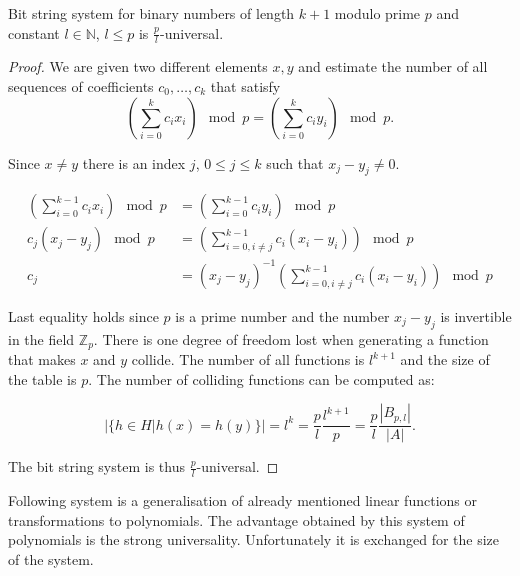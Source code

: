 \begin{remark}
Bit string system for binary numbers of length $k + 1$ modulo prime $p$ and constant $l \in \mathbb{N}$, $l \leq p$ is $\frac{p}{l}$-universal.
\end{remark}
\begin{proof}
We are given two different elements $x, y$ and estimate the number of all sequences of coefficients $c_0, \dots, c_k$ that satisfy
\[
\left( \displaystyle \sum_{i = 0}^{k} c_i x_i \right) \mod p = \left( \displaystyle \sum_{i = 0}^{k} c_i y_i \right) \mod p \textit{.}
\]

Since $x \neq y$ there is an index $j$, $0 \leq j \leq k$ such that $x_j - y_j \neq 0$.

\begin{displaymath}
\begin{split}
\left(\displaystyle \sum_{i=0}^{k-1} c_i x_i\right) \mod p & = \left(\displaystyle \sum_{i=0}^{k-1} c_i y_i\right) \mod p \\
c_j(x_j - y_j) \mod p & = \left(\displaystyle \sum_{i=0, i \neq j}^{k-1} c_i (x_i - y_i)\right) \mod p \\
c_j & = (x_j - y_j) ^ {-1}\left(\displaystyle \sum_{i=0, i \neq j}^{k-1} c_i (x_i - y_i)\right) \mod p
\end{split}
\end{displaymath}

Last equality holds since $p$ is a prime number and the number $x_j - y_j$ is invertible in the field $\mathbb{Z}_p$. There is one degree of freedom lost when generating a function that makes $x$ and $y$ collide. The number of all functions is $l ^ {k + 1}$ and the size of the table is $p$. The number of colliding functions can be computed as:

\begin{displaymath}
|\{h \in H | h(x) = h(y) \}| = l^{k} = \frac{p}{l}\frac{l^{k + 1}}{p} = \frac{p}{l}\frac{|B_{p, l}|}{|A|} \textit{.}
\end{displaymath}

The bit string system is thus $\frac{p}{l}$-universal.
\end{proof}

Following system is a generalisation of already mentioned linear functions or transformations to polynomials. The advantage obtained by this system of polynomials is the strong universality. Unfortunately it is exchanged for the size of the system.

